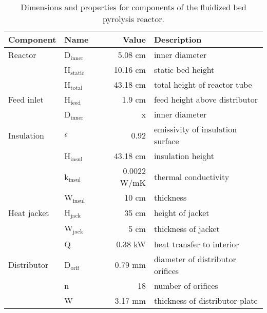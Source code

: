 \begin{table}[H]
    \centering
    \caption{Dimensions and properties for components of the fluidized bed pyrolysis reactor.}
    \label{tab:dimensions}
    \begin{tabular}{llrl}
        \toprule
        Component & Name & Value & Description \\
        \midrule
        Reactor
            & D$_\textrm{inner}$ & 5.08 cm & inner diameter \\
            & H$_\textrm{static}$ & 10.16 cm & static bed height \\
            & H$_\textrm{total}$ & 43.18 cm & total height of reactor tube \\
        Feed inlet
            & H$_\textrm{feed}$ & 1.9 cm & feed height above distributor \\
            & D$_\textrm{inner}$ & x & inner diameter \\
        Insulation & $\epsilon$ & 0.92 & emissivity of insulation surface \\
            & H$_\textrm{insul}$ & 43.18 cm & insulation height \\
            & k$_\textrm{insul}$ & 0.0022 W/mK & thermal conductivity \\
            & W$_\textrm{insul}$ & 10 cm & thickness \\
        Heat jacket & H$_\textrm{jack}$ & 35 cm & height of jacket \\
            & W$_\textrm{jack}$ & 5 cm & thickness of jacket \\
            & Q & 0.38 kW & heat transfer to interior \\
        Distributor
            & D$_\textrm{orif}$ & 0.79 mm & diameter of distributor orifices \\
            & n & 18 & number of orifices \\
            & W & 3.17 mm & thickness of distributor plate \\
        \bottomrule
    \end{tabular}
\end{table}

